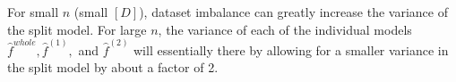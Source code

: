 For small $n$ (small $[D]$), dataset imbalance can greatly increase the variance of the split model. For large $n$, the variance of each of the individual models $\hat{f}^{whole}, \hat{f}^{(1)},$ and $\hat{f}^{(2)}$ will essentially there by allowing for a smaller variance in the split model by about a factor of 2. %